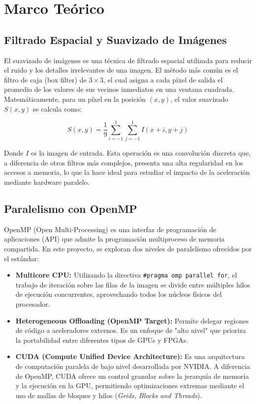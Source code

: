 \section{Marco Teórico}

\subsection{Filtrado Espacial y Suavizado de Imágenes}
El suavizado de imágenes es una técnica de filtrado espacial utilizada para reducir el ruido y los detalles irrelevantes de una imagen. El método más común es el filtro de caja (box filter) de $3 \times 3$, el cual asigna a cada píxel de salida el promedio de los valores de sus vecinos inmediatos en una ventana cuadrada. Matemáticamente, para un píxel en la posición $(x,y)$, el valor suavizado $S(x,y)$ se calcula como:

\begin{equation}
S(x,y) = \frac{1}{9} \sum_{i=-1}^{1} \sum_{j=-1}^{1} I(x+i, y+j)
\end{equation}

Donde $I$ es la imagen de entrada. Esta operación es una convolución discreta que, a diferencia de otros filtros más complejos, presenta una alta regularidad en los accesos a memoria, lo que la hace ideal para estudiar el impacto de la aceleración mediante hardware paralelo.

\subsection{Paralelismo con OpenMP}
OpenMP (Open Multi-Processing) es una interfaz de programación de aplicaciones (API) que admite la programación multiproceso de memoria compartida. En este proyecto, se exploran dos niveles de paralelismo ofrecidos por el estándar:

\begin{itemize}
    \item \textbf{Multicore CPU:} Utilizando la directiva \texttt{\#pragma omp parallel for}, el trabajo de iteración sobre las filas de la imagen se divide entre múltiples hilos de ejecución concurrentes, aprovechando todos los núcleos físicos del procesador.
    \item \textbf{Heterogeneous Offloading (OpenMP Target):} Permite delegar regiones de código a aceleradores externos. Es un enfoque de "alto nivel" que prioriza la portabilidad entre diferentes tipos de GPUs y FPGAs.
    \item \textbf{CUDA (Compute Unified Device Architecture):} Es una arquitectura de computación paralela de bajo nivel desarrollada por NVIDIA. A diferencia de OpenMP, CUDA ofrece un control granular sobre la jerarquía de memoria y la ejecución en la GPU, permitiendo optimizaciones extremas mediante el uso de mallas de bloques y hilos (\textit{Grids, Blocks and Threads}).
\end{itemize}

